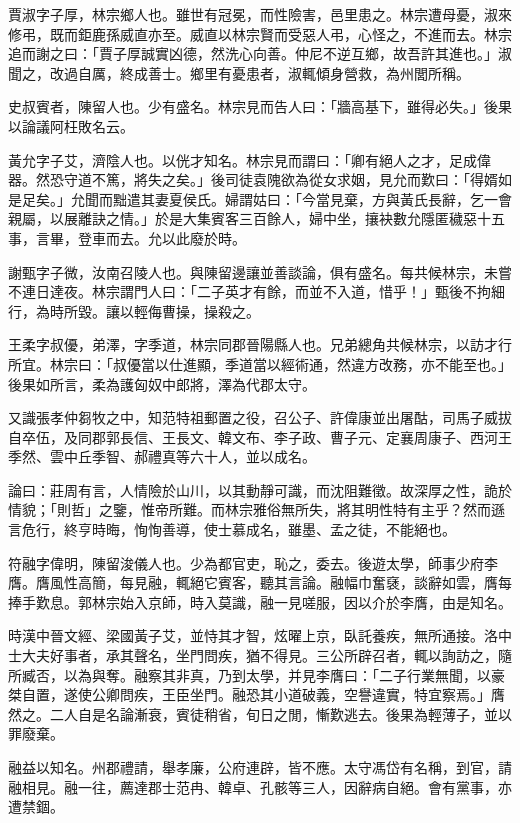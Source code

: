 \begin{pinyinscope}
賈淑字子厚，林宗鄉人也。雖世有冠冕，而性險害，邑里患之。林宗遭母憂，淑來修弔，既而鉅鹿孫威直亦至。威直以林宗賢而受惡人弔，心怪之，不進而去。林宗追而謝之曰：「賈子厚誠實凶德，然洗心向善。仲尼不逆互鄉，故吾許其進也。」淑聞之，改過自厲，終成善士。鄉里有憂患者，淑輒傾身營救，為州閭所稱。

史叔賓者，陳留人也。少有盛名。林宗見而告人曰：「牆高基下，雖得必失。」後果以論議阿枉敗名云。

黃允字子艾，濟陰人也。以侊才知名。林宗見而謂曰：「卿有絕人之才，足成偉器。然恐守道不篤，將失之矣。」後司徒袁隗欲為從女求姻，見允而歎曰：「得婿如是足矣。」允聞而黜遣其妻夏侯氏。婦謂姑曰：「今當見棄，方與黃氏長辭，乞一會親屬，以展離訣之情。」於是大集賓客三百餘人，婦中坐，攘袂數允隱匿穢惡十五事，言畢，登車而去。允以此廢於時。

謝甄字子微，汝南召陵人也。與陳留邊讓並善談論，俱有盛名。每共候林宗，未嘗不連日達夜。林宗謂門人曰：「二子英才有餘，而並不入道，惜乎！」甄後不拘細行，為時所毀。讓以輕侮曹操，操殺之。

王柔字叔優，弟澤，字季道，林宗同郡晉陽縣人也。兄弟總角共候林宗，以訪才行所宜。林宗曰：「叔優當以仕進顯，季道當以經術通，然違方改務，亦不能至也。」後果如所言，柔為護匈奴中郎將，澤為代郡太守。

又識張孝仲芻牧之中，知范特祖郵置之役，召公子、許偉康並出屠酤，司馬子威拔自卒伍，及同郡郭長信、王長文、韓文布、李子政、曹子元、定襄周康子、西河王季然、雲中丘季智、郝禮真等六十人，並以成名。

論曰：莊周有言，人情險於山川，以其動靜可識，而沈阻難徵。故深厚之性，詭於情貌；「則哲」之鑒，惟帝所難。而林宗雅俗無所失，將其明性特有主乎？然而遜言危行，終亨時晦，恂恂善導，使士慕成名，雖墨、孟之徒，不能絕也。

符融字偉明，陳留浚儀人也。少為都官吏，恥之，委去。後遊太學，師事少府李膺。膺風性高簡，每見融，輒絕它賓客，聽其言論。融幅巾奮褎，談辭如雲，膺每捧手歎息。郭林宗始入京師，時入莫識，融一見嗟服，因以介於李膺，由是知名。

時漢中晉文經、梁國黃子艾，並恃其才智，炫曜上京，臥託養疾，無所通接。洛中士大夫好事者，承其聲名，坐門問疾，猶不得見。三公所辟召者，輒以詢訪之，隨所臧否，以為與奪。融察其非真，乃到太學，并見李膺曰：「二子行業無聞，以豪桀自置，遂使公卿問疾，王臣坐門。融恐其小道破義，空譽違實，特宜察焉。」膺然之。二人自是名論漸衰，賓徒稍省，旬日之閒，慚歎逃去。後果為輕薄子，並以罪廢棄。

融益以知名。州郡禮請，舉孝廉，公府連辟，皆不應。太守馮岱有名稱，到官，請融相見。融一往，薦達郡士范冉、韓卓、孔骸等三人，因辭病自絕。會有黨事，亦遭禁錮。


\end{pinyinscope}
